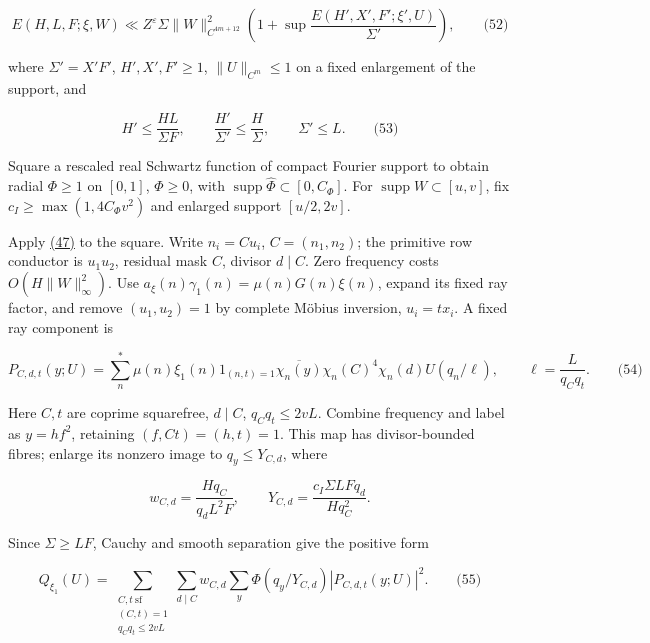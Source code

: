 \label{cf:eq:C.8}

\[
E(H,L,F;\xi,W)
\ll Z^\varepsilon\Sigma\|W\|_{C^{4m+12}}^2
\left(1+\sup\frac{E(H',X',F';\xi',U)}{\Sigma'}\right),
\qquad\text{(52)}
\]

where \(\Sigma'=X'F'\), \(H',X',F'\ge1\), \(\|U\|_{C^m}\le1\) on a fixed enlargement of the support, and

\hypertarget{cf:eq:C.9}{}

\label{cf:eq:C.9}

\[
H'\le\frac{HL}{\Sigma F},\qquad
\frac{H'}{\Sigma'}\le\frac H\Sigma,\qquad \Sigma'\le L.
\qquad\text{(53)}
\]

Square a rescaled real Schwartz function of compact Fourier support to obtain radial \(\Phi\ge1\) on \([0,1]\), \(\Phi\ge0\), with \(\operatorname{supp}\widehat\Phi\subset[0,C_\Phi]\). For \(\operatorname{supp}W\subset[u,v]\), fix \(c_I\ge\max(1,4C_\Phi v^2)\) and enlarged support \([u/2,2v]\).

Apply \protect\hyperlink{cf:eq:C.3}{(47)} to the square. Write \(n_i=Cu_i\), \(C=(n_1,n_2)\); the primitive row conductor is \(u_1u_2\), residual mask \(C\), divisor \(d\mid C\). Zero frequency costs \(O(H\|W\|_\infty^2)\). Use \(a_\xi(n)\gamma_1(n)=\mu(n)G(n)\xi(n)\), expand its fixed ray factor, and remove \((u_1,u_2)=1\) by complete Möbius inversion, \(u_i=tx_i\). A fixed ray component is

\hypertarget{cf:eq:C.10}{}

\label{cf:eq:C.10}

\[
P_{C,d,t}(y;U)=\sum_n^{*}\mu(n)\xi_1(n)1_{(n,t)=1}
\overline{\chi_n(y)}\chi_n(C)^4\chi_n(d)U(q_n/\ell),
\qquad \ell=\frac L{q_Cq_t}.
\qquad\text{(54)}
\]

Here \(C,t\) are coprime squarefree, \(d\mid C\), \(q_Cq_t\le2vL\). Combine frequency and label as \(y=hf^2\), retaining \((f,Ct)=(h,t)=1\). This map has divisor-bounded fibres; enlarge its nonzero image to \(q_y\le Y_{C,d}\), where

\[
w_{C,d}=\frac{Hq_C}{q_dL^2F},\qquad
Y_{C,d}=\frac{c_I\Sigma LFq_d}{Hq_C^2}.
\]

Since \(\Sigma\ge LF\), Cauchy and smooth separation give the positive form

\hypertarget{cf:eq:C.11}{}

\label{cf:eq:C.11}

\[
Q_{\xi_1}(U)=
\sum_{\substack{C,t\ \mathrm{sf}\\(C,t)=1\\q_Cq_t\le2vL}}
\sum_{d\mid C}w_{C,d}\sum_y\Phi(q_y/Y_{C,d})|P_{C,d,t}(y;U)|^2.
\qquad\text{(55)}
\]

